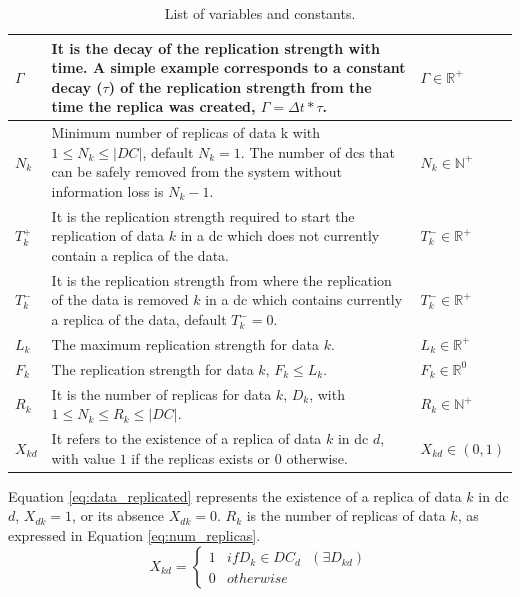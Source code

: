\documentclass[english]{article}
\begin{document}
\begin{table}[ht!]
\begin{tabular}{ |l|p{7.8cm}|l|}
		\hline
		$\Gamma$      & It is the decay of the replication strength with time. A simple example corresponds to a constant decay ($\tau$) of the replication strength from the time the replica was created, $\Gamma = \Delta t * \tau$. & $\Gamma \in \mathbb{R}^{+}$ \\
		\hline
		$N_{k}$           & Minimum number of replicas of data k with $1 \le N_{k} \le |DC|$, default $N_{k} = 1$. The number of \glspl{dc} that can be safely removed from the system without information loss is $N_{k} -1$. & $N_{k} \in \mathbb{N}^{+}$ \\
		\hline
		$T^{+}_{k}$       & It is the replication strength required to start the replication of data $k$ in a \gls{dc} which does not currently contain a replica of the data. & $T^{-}_{k} \in \mathbb{R}^{+}$ \\
		\hline
		$T^{-}_{k}$       & It is the replication strength from where the replication of the data is removed $k$ in a \gls{dc} which contains currently a replica of the data, default $T^{-}_{k} = 0$. & $T^{-}_{k} \in \mathbb{R}^{+}$ \\
		\hline
		$L_{k}$            & The maximum replication strength for data $k$. & $L_{k} \in \mathbb{R}^{+}$ \\
		\hline
		$F_{k}$            & The replication strength for data $k$, $F_{k} \le L_{k}$. & $F_{k} \in \mathbb{R}^{0}$ \\
		\hline
		$R_{k}$            & It is the number of replicas for data $k$, $D_{k}$, with $1 \le N_{k} \le R_{k} \le |DC|$. & $R_{k} \in \mathbb{N}^{+}$ \\
		\hline
		$X_{kd}$            & It refers to the existence of a replica of data $k$ in \gls{dc} $d$, with value $1$ if the replicas exists or $0$ otherwise. & $X_{kd} \in (0, 1)$\\
		\hline
	\end{tabular}
	
	\caption{List of variables and constants.}
	\label{tbl:vars_consts}
\end{table}

Equation \ref{eq:data_replicated} represents the existence of a replica of data $k$ in \gls{dc} $d$, $X_{dk} = 1$, or its absence $X_{dk} = 0$. $R_{k}$ is the number of replicas of data $k$, as expressed in Equation \ref{eq:num_replicas}.
\begin{equation} \label{eq:data_replicated}
	X_{kd} = \left\{
		\begin{array}{ll}
			1 & if D_{k} \in DC_{d} \text{ } (\exists D_{kd})\\
			0 & otherwise
		\end{array}
	\right.
\end{equation}
\end{document}
